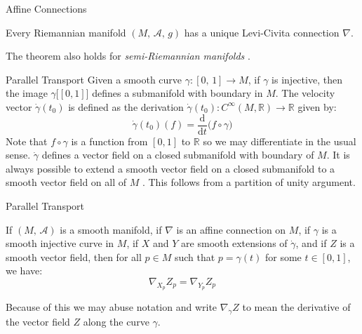 \documentclass{beamer}
\begin{document}
    \begin{frame}{Affine Connections}
        \begin{theorem}
            Every Riemannian manifold $(M,\,\mathcal{A},\,g)$ has a unique
            Levi-Civita connection $\nabla$.
        \end{theorem}
        The theorem also holds for \textit{semi-Riemannian manifolds}
        \cite[p.~61]{OneillSemiRiemannianGeometry}.
    \end{frame}
    \begin{frame}{Parallel Transport}
        Given a smooth curve $\gamma:[0,\,1]\rightarrow{M}$, if $\gamma$ is
        injective, then the image $\gamma\big[[0,1]\big]$ defines a
        submanifold with boundary in $M$. The velocity vector
        $\dot{\gamma}(t_{0})$ is defined as the derivation
        $\dot{\gamma}(t_{0}):C^{\infty}(M,\mathbb{R})\rightarrow\mathbb{R}$
        given by:
        \begin{equation}
            \dot{\gamma}(t_{0})(f)=
                \frac{\textrm{d}}{\textrm{d}t}\Big(f\circ\gamma\Big)
        \end{equation}
        Note that $f\circ\gamma$ is a function from $[0,1]$ to $\mathbb{R}$ so
        we may differentiate in the usual sense. $\dot{\gamma}$ defines a vector
        field on a closed submanifold with boundary of $M$. It is always
        possible to extend a smooth vector field on a closed submanifold to a
        smooth vector field on all of $M$
        \cite[p.~176-177]{LeeSmoothManifolds}.
        This follows from a partition of unity argument.
    \end{frame}
    \begin{frame}{Parallel Transport}
        \begin{theorem}
            If $(M,\,\mathcal{A})$ is a smooth manifold, if $\nabla$ is an
            affine connection on $M$, if $\gamma$ is a smooth injective curve
            in $M$, if $X$ and $Y$ are smooth extensions of $\dot{\gamma}$,
            and if $Z$ is a smooth vector field, then for all $p\in{M}$ such
            that $p=\gamma(t)$ for some $t\in[0,1]$, we have:
            \begin{equation}
                \nabla_{X_{p}}Z_{p}=\nabla_{Y_{p}}Z_{p}
            \end{equation}
        \end{theorem}
        Because of this we may abuse notation and write
        $\nabla_{\dot{\gamma}}Z$ to mean the derivative of the vector field $Z$
        along the curve $\gamma$.
    \end{frame}
\end{document}
